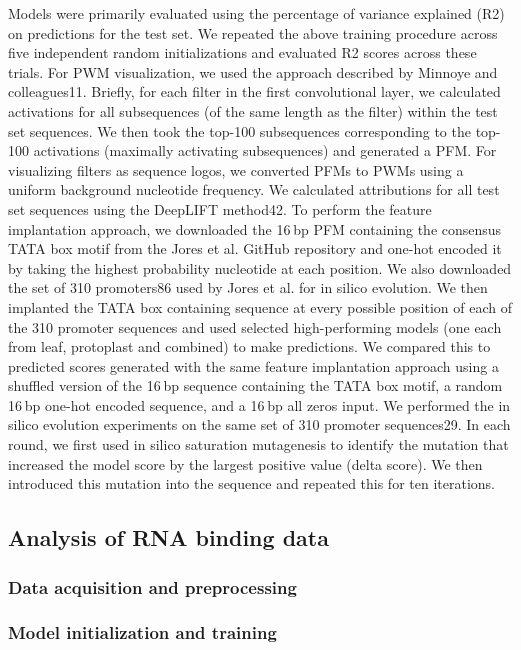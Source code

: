 Models were primarily evaluated using the percentage of variance explained (R2) on predictions for the test set. We repeated the above training procedure across five independent random initializations and evaluated R2 scores across these trials. For PWM visualization, we used the approach described by Minnoye and colleagues11. Briefly, for each filter in the first convolutional layer, we calculated activations for all subsequences (of the same length as the filter) within the test set sequences. We then took the top-100 subsequences corresponding to the top-100 activations (maximally activating subsequences) and generated a PFM. For visualizing filters as sequence logos, we converted PFMs to PWMs using a uniform background nucleotide frequency. We calculated attributions for all test set sequences using the DeepLIFT method42. To perform the feature implantation approach, we downloaded the 16 bp PFM containing the consensus TATA box motif from the Jores et al. GitHub repository and one-hot encoded it by taking the highest probability nucleotide at each position. We also downloaded the set of 310 promoters86 used by Jores et al. for in silico evolution. We then implanted the TATA box containing sequence at every possible position of each of the 310 promoter sequences and used selected high-performing models (one each from leaf, protoplast and combined) to make predictions. We compared this to predicted scores generated with the same feature implantation approach using a shuffled version of the 16 bp sequence containing the TATA box motif, a random 16 bp one-hot encoded sequence, and a 16 bp all zeros input. We performed the in silico evolution experiments on the same set of 310 promoter sequences29. In each round, we first used in silico saturation mutagenesis to identify the mutation that increased the model score by the largest positive value (delta score). We then introduced this mutation into the sequence and repeated this for ten iterations.

\subsection{Analysis of RNA binding data}

\subsubsection{Data acquisition and preprocessing}

\subsubsection{Model initialization and training}

